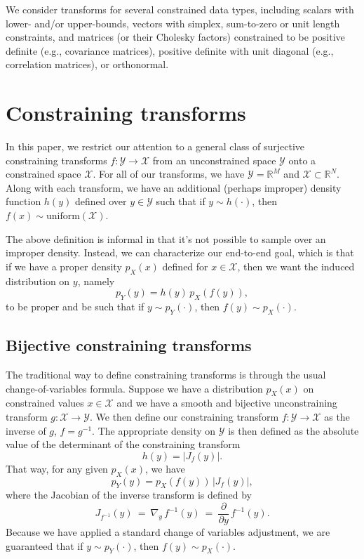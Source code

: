 \documentclass[11pt]{article}
\newcommand{\abs}[1]{\left| #1 \right|}
\newcommand{\absdet}[1]{\abs{#1}}
\begin{document}
We consider transforms for several constrained data types, including scalars with lower- and/or upper-bounds, vectors with simplex, sum-to-zero or unit length constraints, and matrices (or their Cholesky factors) constrained to be positive definite (e.g., covariance matrices), positive definite with unit diagonal (e.g., correlation matrices), or orthonormal.  

\section{Constraining transforms}

In this paper, we restrict our attention to a general class of surjective constraining transforms $f : \mathcal{Y} \rightarrow \mathcal{X}$ from an unconstrained space $\mathcal{Y}$ onto a constrained space $\mathcal{X}$.  For all of our transforms, we have $\mathcal{Y} = \mathbb{R}^M$ and $\mathcal{X} \subset \mathbb{R}^N$.  Along with each transform, we have an additional (perhaps improper) density function $h(y)$ defined over $y \in \mathcal{Y}$ such that if $y \sim h(\cdot)$, then $f(x) \sim \textrm{uniform}(\mathcal{X}).$  

The above definition is informal in that it's not possible to sample over an improper density.  Instead, we can characterize our end-to-end goal, which is that if we have a proper density $p_X(x)$ defined for $x \in \mathcal{X}$, then we want the induced distribution on $y$, namely
$$
p_Y(y) = h(y) \, p_X(f(y)),
$$
to be proper and be such that if $y \sim p_Y(\cdot)$, then $f(y) \sim p_X(\cdot)$.

\subsection{Bijective constraining transforms}

The traditional way to define constraining transforms is through the usual change-of-variables formula.  Suppose we have a distribution $p_X(x)$ on constrained values $x \in \mathcal{X}$ and we have a smooth and bijective unconstraining transform $g : \mathcal{X} \rightarrow \mathcal{Y}$.  We then define our constraining transform $f : \mathcal{Y} \rightarrow \mathcal{X}$ as the inverse of $g$, $f = g^{-1}$.  The appropriate density on $\mathcal{Y}$ is then defined as the absolute value of the determinant of the constraining transform
\[
h(y) = \absdet{J_f(y)}.
\]
That way, for any given $p_X(x)$, we have
\[
p_Y(y) = p_X(f(y)) \, \absdet{J_f(y)},
\]
where the Jacobian of the inverse transform is defined by
\[
  J_{f^{-1}}(y) \ = \ \nabla_y \, f^{-1}(y) \ = \ \frac{\partial}{\partial y} \, f^{-1}(y).
\]
Because we have applied a standard change of variables adjustment, we are guaranteed that if $y \sim p_Y(\cdot)$, then $f(y) \sim p_X(\cdot)$.
\end{document}
